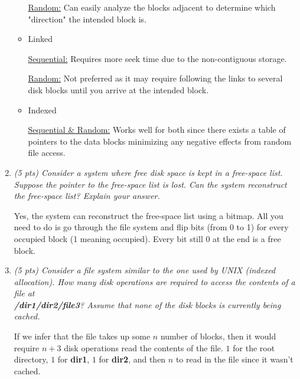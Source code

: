 \documentclass[12pt]{article}
\begin{document}
\begin{enumerate}
\begin{itemize}
		\par \underline{Random:} Can easily analyze the blocks adjacent to determine which "direction" the intended block is.
		\item Linked
		\par \underline{Sequential:} Requires more seek time due to the non-contiguous storage.
		\par \underline{Random:} Not preferred as it may require following the links to several disk blocks until you arrive at the intended block.
		\item Indexed
		\par \underline{Sequential \& Random:} Works well for both since there exists a table of pointers to the data blocks minimizing any negative effects from random file access.
	\end{itemize}
	\color{black}
	\item{\textit{(5 pts) Consider a system where free disk space is kept in a free-space list. Suppose the pointer to the free-space list is lost. Can the system reconstruct the free-space list? Explain your answer.}}
	\color{blue}
	\par Yes, the system can reconstruct the free-space list using a bitmap. All you need to do is go through the file system and flip bits (from 0 to 1) for every occupied block (1 meaning occupied). Every bit still 0 at the end is a free block.
	\color{black}
	\item{\textit{(5 pts) Consider a file system similar to the one used by UNIX (indexed allocation). How many disk operations are required to access the contents of a file at\\ \textbf{/dir1/dir2/file3}? Assume that none of the disk blocks is currently being cached.}}
	\color{blue}
	\par If we infer that the file takes up some $n$ number of blocks, then it would require $n+3$ disk operations read the contents of the file. $1$ for the root directory, $1$ for \textbf{dir1}, $1$ for \textbf{dir2}, and then $n$ to read in the file since it wasn't cached.
	\color{black}

\end{enumerate}
\end{document}
